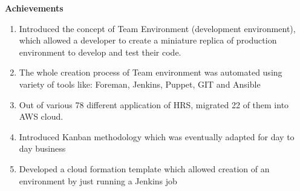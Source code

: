 \documentclass[11.9pt]{xetexCV}
\begin{document}
\textbf{{\color{bluesubheading}Achievements}}
\begin{enumerate}[leftmargin=4.5cm,label=\textbullet]
\item Introduced the concept of Team Environment (development environment), which allowed a developer to create a miniature replica of production environment to develop and test their code.
\item The whole creation process of Team environment was automated using variety of tools like: Foreman, Jenkins, Puppet, GIT and Ansible
\item Out of various 78 different application of HRS, migrated 22 of them into AWS cloud.
\item Introduced Kanban methodology which was eventually adapted for day to day business
\item Developed a cloud formation template which allowed creation of an environment by just running a Jenkins job
\end{enumerate}
\end{document}
